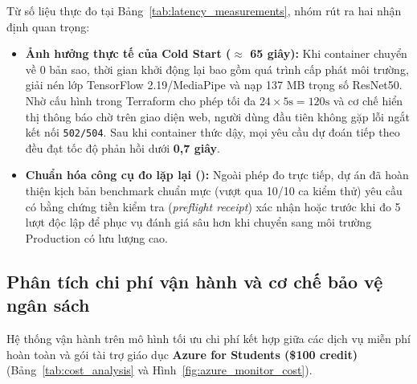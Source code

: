 Từ số liệu thực đo tại Bảng~\ref{tab:latency_measurements}, nhóm rút ra hai nhận định quan trọng:
\begin{itemize}
    \item \textbf{Ảnh hưởng thực tế của Cold Start ($\approx$ 65 giây):} Khi container chuyển về 0 bản sao, thời gian khởi động lại bao gồm quá trình cấp phát môi trường, giải nén lớp TensorFlow 2.19/MediaPipe và nạp 137 MB trọng số ResNet50. Nhờ cấu hình  trong Terraform cho phép tối đa $24 \times 5\text{s} = 120\text{s}$ và cơ chế hiển thị thông báo chờ trên giao diện web, người dùng đầu tiên không gặp lỗi ngắt kết nối \texttt{502/504}. Sau khi container thức dậy, mọi yêu cầu dự đoán tiếp theo đều đạt tốc độ phản hồi dưới \textbf{0,7 giây}.
    \item \textbf{Chuẩn hóa công cụ đo lặp lại ():} Ngoài phép đo trực tiếp, dự án đã hoàn thiện kịch bản benchmark chuẩn mực (vượt qua 10/10 ca kiểm thử) yêu cầu có bằng chứng tiền kiểm tra (\textit{preflight receipt}) xác nhận  hoặc  trước khi đo 5 lượt độc lập để phục vụ đánh giá sâu hơn khi chuyển sang môi trường Production có lưu lượng cao.
\end{itemize}

\subsection{Phân tích chi phí vận hành và cơ chế bảo vệ ngân sách}
\label{subsec:phan_tich_chi_phi}

Hệ thống vận hành trên mô hình tối ưu chi phí kết hợp giữa các dịch vụ miễn phí hoàn toàn và gói tài trợ giáo dục \textbf{Azure for Students (\$100 credit)} (Bảng~\ref{tab:cost_analysis} và Hình~\ref{fig:azure_monitor_cost}).

